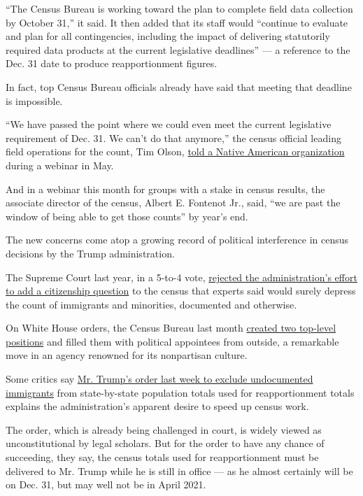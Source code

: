 ``The Census Bureau is working toward the plan to complete field data
collection by October 31,'' it said. It then added that its staff would
``continue to evaluate and plan for all contingencies, including the
impact of delivering statutorily required data products at the current
legislative deadlines'' --- a reference to the Dec. 31 date to produce
reapportionment figures.

In fact, top Census Bureau officials already have said that meeting that
deadline is impossible.

``We have passed the point where we could even meet the current
legislative requirement of Dec. 31. We can't do that anymore,'' the
census official leading field operations for the count, Tim Olson,
\href{https://www.youtube.com/watch?v=F6IyJMtDDgY\&feature=youtu.be\&t=4688}{told
a Native American organization} during a webinar in May.

And in a webinar this month for groups with a stake in census results,
the associate director of the census, Albert E. Fontenot Jr., said, ``we
are past the window of being able to get those counts'' by year's end.

The new concerns come atop a growing record of political interference in
census decisions by the Trump administration.

The Supreme Court last year, in a 5-to-4 vote,
\href{https://www.nytimes.com/2019/06/27/us/politics/supreme-court-gerrymandering-census.html}{rejected
the administration's effort to add a citizenship question} to the census
that experts said would surely depress the count of immigrants and
minorities, documented and otherwise.

On White House orders, the Census Bureau last month
\href{https://www.nytimes.com/2020/06/23/us/census-bureau-cogley-korzeniewski.html}{created
two top-level positions} and filled them with political appointees from
outside, a remarkable move in an agency renowned for its nonpartisan
culture.

Some critics say
\href{https://www.nytimes.com/2020/07/21/us/politics/trump-immigrants-census-redistricting.html}{Mr.
Trump's order last week to exclude undocumented immigrants} from
state-by-state population totals used for reapportionment totals
explains the administration's apparent desire to speed up census work.

The order, which is already being challenged in court, is widely viewed
as unconstitutional by legal scholars. But for the order to have any
chance of succeeding, they say, the census totals used for
reapportionment must be delivered to Mr. Trump while he is still in
office --- as he almost certainly will be on Dec. 31, but may well not
be in April 2021.

